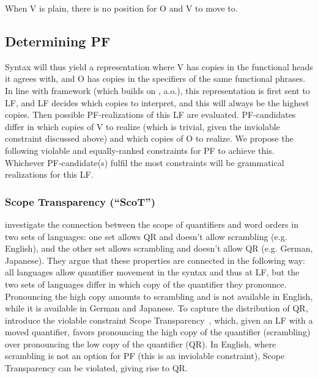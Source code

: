 \documentclass[output=paper,colorlinks,citecolor=brown,
]{langscibook}
\begin{document}
When V is plain, there is no position for O and V to move to.

\subsection{Determining PF} 
\label{lasz:sec:23}

Syntax will thus yield a representation where V has copies in the
functional heads it agrees with, and O has copies in the specifiers of
the same functional phrases. In line with  
framework (which builds on \citealp{Bobaljik.1995,Bobaljik.2002,Brody.1995,ErteschikShir.1997}, a.o.), 
this representation is first sent to LF, and
LF decides which copies to interpret, and this will always be the
highest copies. Then possible PF-realizations of this LF are evaluated.
PF-candidates differ in which copies of V to realize (which is trivial,
given the inviolable constraint discussed above) and which copies of
O to realize. We propose the following violable and equally-ranked
constraints for PF to achieve this. Whichever PF-candidate(s) fulfil the most constraints will
be grammatical realizations for this LF.

\subsubsection{Scope Transparency (``ScoT'')}

\citet{Bobaljik.Wurmbrand.2012} investigate the connection between the
scope of quantifiers and word orders in two sets of languages: one set
allows QR and doesn’t allow scrambling (e.g. English), and the other
set allows scrambling and doesn’t allow QR (e.g. German, Japanese).
They argue that these properties are connected in the following way:
all languages allow quantifier movement in the syntax and thus at LF,
but the two sets of languages differ in which copy of the quantifier
they pronounce. Pronouncing the high copy amounts to scrambling
and is not available in English, while it is available in German and
Japanese. To capture the distribution of QR, \citeauthor{Bobaljik.Wurmbrand.2012} introduce the
violable constraint Scope Transparency~, which, given an LF with
a moved quantifier, favors pronouncing the high copy of the quantifier
(scrambling) over pronouncing the low copy of the quantifier (QR). In
English, where scrambling is not an option for PF (this is an inviolable
constraint), Scope Transparency can be violated, giving rise to QR.
\end{document}
